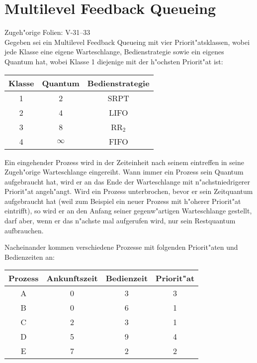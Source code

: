 \section{Multilevel Feedback Queueing}

Zugeh"orige Folien:  V-31--33 \\

Gegeben sei ein Multilevel Feedback Queueing mit vier
Priorit"atsklassen, wobei jede Klasse eine eigene Warteschlange,
Bedienstrategie sowie ein eigenes Quantum hat, wobei Klasse 1 diejenige
mit der h"ochsten Priorit"at ist:

\begin{center}
  \begin{tabular}{ccc}
    \toprule
    Klasse & Quantum  & Bedienstrategie \\
    \midrule
    1      & 2        & SRPT \\
    2      & 4        & LIFO \\
    3      & 8        & RR${}_2$ \\
    4      & $\infty$ & FIFO \\
    \bottomrule
  \end{tabular}
\end{center}

Ein eingehender Prozess wird in der Zeiteinheit nach seinem eintreffen
in seine Zugeh"orige Warteschlange eingereiht.  Wann immer ein Prozess
sein Quantum aufgebraucht hat, wird er an das Ende der Warteschlange mit
n"achstniedrigerer Priorit"at angeh"angt.  Wird ein Prozess
unterbrochen, bevor er sein Zeitquantum aufgebraucht hat (weil zum
Beispiel ein neuer Prozess mit h"oherer Priorit"at eintrifft), so wird
er an den Anfang seiner gegenw"artigen Warteschlange gestellt, darf
aber, wenn er das n"achste mal aufgerufen wird, nur sein Restquantum
aufbrauchen.

Nacheinander kommen verschiedene Prozesse mit folgenden Priorit"aten und
Bedienzeiten an:

\begin{center}
  \begin{tabular}{cccc}
    \toprule
    Prozess & Ankunftszeit & Bedienzeit & Priorit"at \\
    \midrule
    A       & 0            & 3          & 3 \\
    B       & 0            & 6          & 1 \\
    C       & 2            & 3          & 1 \\
    D       & 5            & 9          & 4 \\
    E       & 7            & 2          & 2 \\
    \bottomrule
  \end{tabular}
\end{center}

